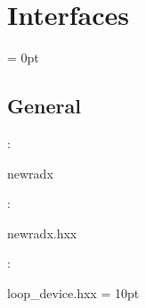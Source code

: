 
\section{Interfaces} 


\parskip = 0pt

\vspace{3mm} \subsection*{General}

: 

newradx
\vspace{2mm}

\vspace{5mm}

: 



newradx.hxx
\vspace{2mm}

: 

loop\_device.hxx
\vspace{2mm}\parskip = 10pt 
